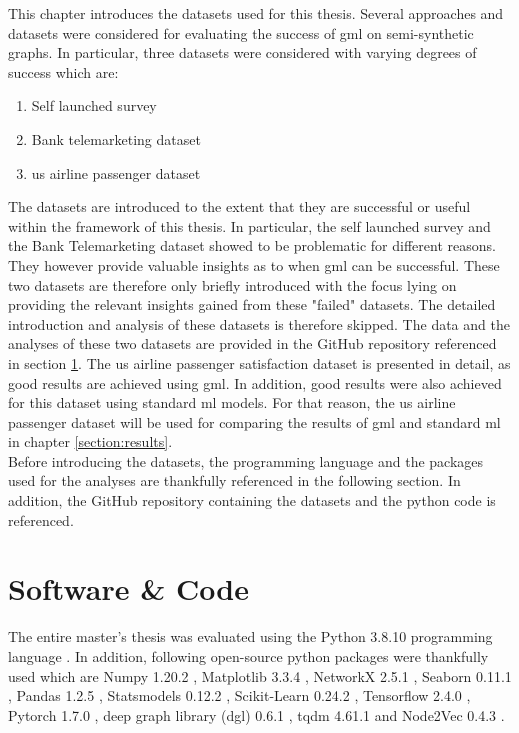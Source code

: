   
  This chapter introduces the datasets used for this thesis. Several approaches
  and datasets were considered for evaluating the success of \acs{gml} on 
  semi-synthetic graphs. In particular, three datasets were considered with 
  varying degrees of success which are:

  \begin{enumerate}
    \item Self launched survey
    \item Bank telemarketing dataset
    \item \acs{us} airline passenger dataset
  \end{enumerate}

  \noindent The datasets are introduced to the extent that they are successful 
  or useful within the framework of this thesis. In particular, the self 
  launched survey and the Bank Telemarketing dataset showed to be problematic 
  for different reasons. They however provide valuable insights as to when 
  \acs{gml} can be successful. These two datasets are therefore only briefly 
  introduced with the focus lying on providing the relevant insights gained 
  from these "failed" datasets. The detailed introduction and analysis of these 
  datasets is therefore skipped. The data and the analyses of these two datasets 
  are provided in the GitHub repository referenced in section 
  \ref{section:software}. The \acs{us} airline passenger satisfaction dataset 
  is presented in detail, as good results are achieved using \acs{gml}. In
  addition, good results were also achieved for this dataset using standard
  \acs{ml} models. For that reason, the \acs{us} airline passenger dataset will
  be used for comparing the results of \acs{gml} and standard \acs{ml} in
  chapter \ref{section:results}. \\

  \noindent Before introducing the datasets, the programming language and the
   packages used for the analyses are thankfully referenced in the following 
   section. In addition, the GitHub repository containing the datasets and the 
   python code is referenced.

  \section{Software \& Code}
  \label{section:software}

  The entire master's thesis was evaluated using the Python 3.8.10 programming
  language \citep{vanRossum2009}. In addition, following open-source python
  packages were thankfully used which are Numpy 1.20.2 \citep{harris2020array},
  Matplotlib 3.3.4 \citep{Hunter2007}, NetworkX 2.5.1 \citep{hagberg2008exploring}, 
  Seaborn 0.11.1 \citep{Waskom2021}, Pandas 1.2.5 \citep{mckinney2010data}, 
  Statsmodels 0.12.2 \citep{seabold2010statsmodels}, Scikit-Learn 0.24.2 
  \citep{pedregosa2011scikit}, Tensorflow 2.4.0 \citep{abadi2016tensorflow}, 
  Pytorch 1.7.0 \citep{paszke2019pytorch}, deep graph library (dgl) 0.6.1 
  \citep{wang2019deep}, tqdm 4.61.1 \citep{da2021tqdm} and Node2Vec 0.4.3 
  \citep{Cohen2021}. \\

